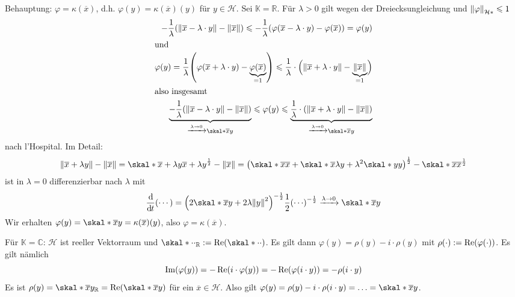 \begin{enumerate}[(i)]
	Behauptung: $\varphi= \kappa(\overline{x})$, d.h. $\varphi(y)= \kappa(\overline{x})(y)$ für $y \in \mathcal{H}$. Sei $\mathds{K}=\mathds{R}$. Für $\lambda>0$ gilt
	wegen der Dreiecksungleichung und $\norm[\mathcal{H}*]{\varphi}\le 1$
	\begin{align*}
		-\frac{1}{\lambda} \enbrace*{\norm{\overline{x} - \lambda \cdot y } - \norm{\overline{x}}} \le -\frac{1}{\lambda} \enbrace*{\varphi \enbrace*{\overline{x}- \lambda 
		\cdot y} - \varphi(\overline{x})} = \varphi(y) \\
		\shortintertext{und}
		\varphi(y) = \frac{1}{\lambda} \enbrace*{\varphi(\overline{x}+\lambda \cdot y) - \underbrace{\varphi(\overline{x})}_{=1}} 
		\le \frac{1}{\lambda} \cdot \enbrace[\Big]{\norm{\overline{x} + \lambda \cdot y } - \underbrace{\norm{\overline{x}}}_{=1} }    \\
		\shortintertext{also insgesamt}
		 \underbrace{-\frac{1}{\lambda} \enbrace*{\norm{\overline{x} - \lambda \cdot y } - \norm{\overline{x}}} }_{\xrightarrow{\lambda \to 0} \skal*{\overline{x}}{y}}
		 \le \varphi(y) 
		 \le \underbrace{\frac{1}{\lambda} \cdot \enbrace*{\norm{\overline{x} +\lambda\cdot y} - \norm{\overline{x}}}}_{\xrightarrow{\lambda \to 0} \skal*{\overline{x}}{y}}
	\end{align*}
	nach l'Hospital. Im Detail: 
	\begin{align*}
		\norm{\overline{x} + \lambda y} - \norm{\overline{x}} = \skal*{\overline{x} + \lambda y }{\overline{x} + \lambda y }^{\frac{1}{2}} - \norm{\overline{x}}= \enbrace*{\skal*{\overline{x}}{\overline{x}} +
		\skal*{\overline{x}}{\lambda y} + \lambda^2 \skal*{y}{y}}^{\frac{1}{2}} - \skal*{\overline{x}}{\overline{x}}^{\frac{1}{2}}
	\end{align*}
	ist in $\lambda=0$ differenzierbar nach $\lambda$ mit 
	\[
		\diffd{}{t}(\cdots) = \enbrace*{2 \skal*{\overline{x}}{y} + 2 \lambda \norm{y}^2}^{-\frac{1}{2} } \frac{1}{2} \enbrace*{\cdots}^{-\frac{1}{2}} 
		\xrightarrow{\lambda \to 0}  \skal*{\overline{x}}{y}
	\]
	Wir erhalten $\varphi(y)= \skal*{\overline{x}}{y} = \kappa(\overline{x})(y)$, also $\varphi=\kappa(\overline{x})$. 
	
	Für $\mathds{K}=\mathds{C}$: $\mathcal{H}$ ist reeller Vektorraum und $\skal*{\cdot}{\cdot}_\mathds{R} := \re \enbrace*{\skal*{\cdot}{\cdot}}$. Es gilt dann 
	$\varphi(y) = \rho(y) - i \cdot \rho(y)$ mit $\rho(\cdot ) := \re \enbrace*{\varphi(\cdot )}$. Es gilt nämlich
	\[
		\im \enbrace*{\varphi(y)} = - \re \enbrace*{i \cdot \varphi(y)} = - \re \enbrace*{\varphi(i \cdot y)} = - \rho (i \cdot y)   
	\]
	Es ist $\rho(y) = \skal*{\overline{x}}{y}_\mathds{R} = \re \enbrace*{\skal*{\overline{x}}{y}}$ für ein $\overline{x} \in \mathcal{H}$. Also gilt
	$\varphi(y)= \rho(y)- i \cdot \rho(i \cdot y)= \ldots = \skal*{\overline{x}}{y}$. \bewende
\end{enumerate}

